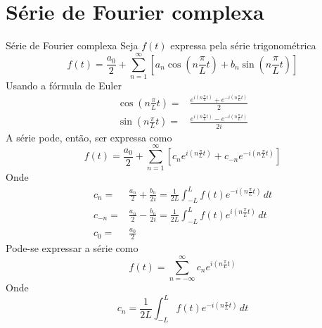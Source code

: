       \section[ slide = true]{Série de Fourier complexa}
      \begin{slide}{Série de Fourier complexa}
	      \twocolumn
	      {
	      Seja $f(t)$ expressa pela série trigonométrica
	      \begin{equation*}
		      f(t) = \frac{a_0}{2} + \sum_{n=1}^\infty \left [ a_n \cos \left ( n\frac{\pi}{L}t \right ) + b_n \sin \left ( n\frac{\pi}{L}t \right )\right ]
	      \end{equation*}
	      Usando a fórmula de Euler
	      \begin{align*}
		      \cos \left ( n\frac{\pi}{L}t \right ) =& \frac{e^{i\left ( n\frac{\pi}{L}t \right )} + e^{-i\left ( n\frac{\pi}{L}t \right )}}{2}\\ 
		      \sin \left ( n\frac{\pi}{L}t \right ) =& \frac{e^{i\left ( n\frac{\pi}{L}t \right )} - e^{-i\left ( n\frac{\pi}{L}t \right )}}{2i} 
	      \end{align*}
	      A série pode, então, ser expressa como
	      \begin{equation*}
		      f(t) = \frac{a_0}{2} + \sum_{n=1}^\infty \left [ c_n e^{i\left ( n\frac{\pi}{L}t \right )} + c_{-n} e^{-i\left ( n\frac{\pi}{L}t \right )} \right ]
	      \end{equation*}
	      }
	      {
		      Onde
		      \begin{align*}
			      c_n =& \frac{a_n}{2} + \frac{b_n}{2i} = \frac{1}{2L}\int_{-L}^L f(t)e^{-i\left ( n\frac{\pi}{L}t \right )}\, dt\\
			      c_{-n} =& \frac{a_n}{2} - \frac{b_n}{2i} = \frac{1}{2L}\int_{-L}^L f(t)e^{i\left ( n\frac{\pi}{L}t \right )}\, dt\\
			      c_0 =& \frac{a_0}{2}
		      \end{align*}
		      Pode-se expressar a série como 
	      \begin{equation*}
		      f(t) = \sum_{n=-\infty}^\infty c_n e^{i\left ( n\frac{\pi}{L}t \right )}
	      \end{equation*}
	      Onde 
	      \begin{equation*}
			      c_n =\frac{1}{2L}\int_{-L}^L f(t)e^{-i\left ( n\frac{\pi}{L}t \right )}\, dt
	      \end{equation*}
	      }
      \end{slide}

